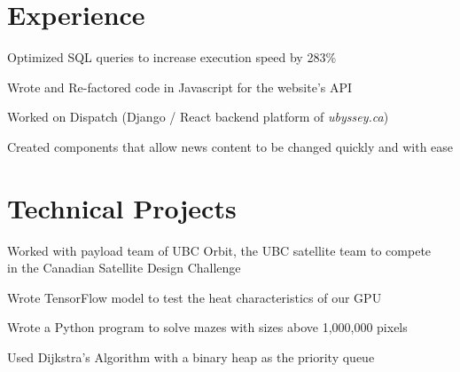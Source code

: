 \documentclass[]{deedy-resume-openfont}
\begin{document}
    
    \section{Experience}
    
    \begin{tightemize}
    \item Optimized SQL queries to increase execution speed by 283\%
    \item Wrote and Re-factored code in Javascript for the website’s API
    \end{tightemize}
    \sectionsep
    
    \begin{tightemize}
    \item Worked on Dispatch (Django / React backend platform of \textit{ubyssey.ca})
    \item Created components that allow news content to be changed quickly and with ease
    \end{tightemize}
    \sectionsep
    
    \section{Technical Projects}
    
    \begin{tightemize}
    \item Worked with payload team of UBC Orbit, the UBC satellite team to compete \\ in the Canadian Satellite Design Challenge 
    \item Wrote TensorFlow model to test the heat characteristics of our GPU 
    \end{tightemize}
    \sectionsep
    
    \begin{tightemize}
    \item Wrote a Python program to solve mazes with sizes above 1,000,000 pixels
    \item Used Dijkstra’s Algorithm with a binary heap as the priority queue
    \end{tightemize}
    \sectionsep
    
\end{document}
